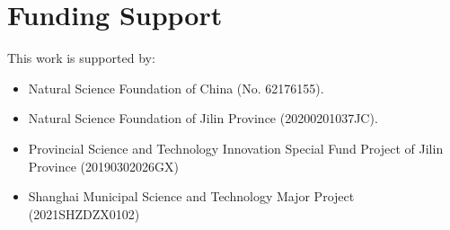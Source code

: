 \documentclass[10pt,twocolumn,letterpaper]{article}
\begin{document}
\section{Funding Support}
\label{sec:supp_fund}
This work is supported by:
\begin{itemize}
    \item Natural Science Foundation of China (No. 62176155).
    \item Natural Science Foundation of Jilin Province (20200201037JC).
    \item Provincial Science and Technology Innovation Special Fund Project of Jilin Province (20190302026GX)
    \item Shanghai Municipal Science and Technology Major Project (2021SHZDZX0102)
\end{itemize}
\end{document}
